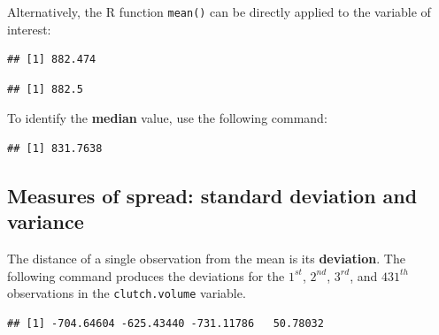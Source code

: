 Alternatively, the \textsf{R} function \texttt{mean()} can be directly applied to the variable of interest:
\begin{knitrout}
\color{fgcolor}\begin{kframe}
\begin{alltt}
 \hlkwb{=} \hlopt{$}
\end{alltt}
\begin{verbatim}
## [1] 882.474
\end{verbatim}
\begin{alltt}
 \hlstd{)}
\end{alltt}
\begin{verbatim}
## [1] 882.5
\end{verbatim}
\end{kframe}
\end{knitrout}

To identify the \textbf{median} value, use the following command:

\begin{knitrout}
\color{fgcolor}\begin{kframe}
\begin{alltt}
\hlopt{$}
\end{alltt}
\begin{verbatim}
## [1] 831.7638
\end{verbatim}
\end{kframe}
\end{knitrout}

\subsection{Measures of spread: standard deviation and variance}

The distance of a single observation from the mean is its \textbf{deviation}. The following command produces the deviations for the $1^{st}$, $2^{nd}$, $3^{rd}$, and $431^{th}$ observations in the \texttt{clutch.volume} variable.

\begin{knitrout}
\color{fgcolor}\begin{kframe}
\begin{alltt}
\hlopt{$}\hlstd{clutch.volume[}\hlstd{(}\hlstd{,}\hlstd{,}\hlstd{,}\hlstd{)]}\hlopt{-}
\end{alltt}
\begin{verbatim}
## [1] -704.64604 -625.43440 -731.11786   50.78032
\end{verbatim}
\end{kframe}
\end{knitrout}

